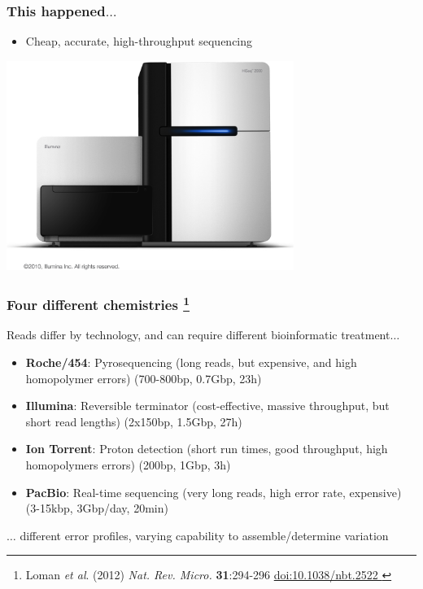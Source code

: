 
%
\begin{frame}
  \frametitle{This happened$\ldots$}
  \begin{itemize}
    \item Cheap, accurate, high-throughput sequencing
  \end{itemize}
  \begin{center}
    \includegraphics[width=0.7\textwidth]{images/illumina_hiseq}
  \end{center}  
\end{frame}

\begin{frame}
  \frametitle{Four different chemistries
\footnote{\tiny{Loman \textit{et al}. (2012) \textit{Nat. Rev. Micro.} \textbf{31}:294-296 \href{http://dx.doi.org/10.1038/nbt.2522}{doi:10.1038/nbt.2522
}}}
}
  Reads differ by technology, and can require different bioinformatic treatment$\ldots$
  \begin{itemize}
    \item \textcolor{hutton_green}{\textbf{Roche/454}: Pyrosequencing (long reads, but expensive, and high homopolymer errors) (700-800bp, 0.7Gbp, 23h)}
    \item \textcolor{hutton_blue}{\textbf{Illumina}: Reversible terminator (cost-effective, massive throughput, but short read lengths) (2x150bp, 1.5Gbp, 27h)}
    \item \textcolor{RawSienna}{\textbf{Ion Torrent}: Proton detection (short run times, good throughput, high homopolymers errors) (200bp, 1Gbp, 3h)}
    \item \textcolor{hutton_purple}{\textbf{PacBio}: Real-time sequencing (very long reads, high error rate, expensive) (3-15kbp, 3Gbp/day, 20min)}
  \end{itemize}
  $\ldots$ different error profiles, varying capability to assemble/determine variation
\end{frame}

